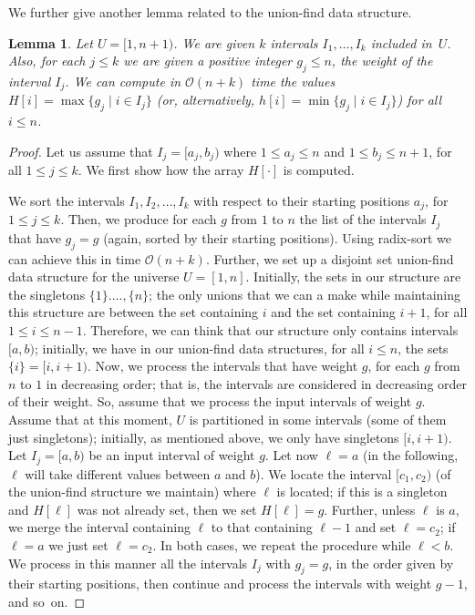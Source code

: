 \documentclass[final]{dmtcs-episciences}
\newcommand{\bigo}{{\mathcal O}}
\newtheorem{lemma}{Lemma}
\begin{document}
We further give another lemma related to the union-find data structure.
\begin{lemma}\label{stabbing}
Let $U=[1,n+1)$. We are given $k$ intervals $I_1,\ldots, I_k$ included in~$U$. Also, for each $j\leq k$ we are given a positive integer $g_j\leq n$, the weight of the interval $I_j$. We can compute in $\bigo(n+k)$ time the values $H[i]=\max\{g_j\mid i\in I_j\}$ (or, alternatively, $h[i]=\min\{g_j\mid i\in I_j\}$) for all $i\leq n$.  
\end{lemma}
\begin{proof}
Let us assume that $I_j=[a_j,b_j)$ where $1\leq a_j\leq n$ and $1\leq b_j\leq n+1$, for all $1\leq j\leq k$. We first show how the array $H[\cdot]$ is computed.  

We sort the intervals $I_1, I_2,\ldots, I_k$ with respect to their starting positions $a_j$, for $1\leq j\leq k$. Then, we produce for each $g$ from $1$ to $n$ the list of the intervals $I_j$ that have $g_j=g$ (again, sorted by their starting positions). Using radix-sort we can achieve this in time $\bigo(n+k)$. Further, we set up a disjoint set union-find data structure for the universe $U=[1,n]$. Initially, the sets in our structure are the singletons $\{1\}.\ldots,\{n\}$; the only unions that we can a make while maintaining this structure are between the set containing $i$ and the set containing $i+1$, for all $1\leq i\leq n-1$. Therefore, we can think that our structure only contains intervals $[a,b)$; initially, we have in our union-find data structures, for all $i\leq n$, the sets $\{i\}=[i,i+1)$. Now, we process the intervals that have weight $g$, for each $g$ from $n$ to $1$ in decreasing order; that is, the intervals are considered in decreasing order of their weight. So, assume that we process the input intervals of weight $g$. Assume that at this moment, $U$ is partitioned in some intervals (some of them just singletons); initially, as mentioned above, we only have singletons $[i,i+1)$. Let $I_j=[a,b)$ be an input interval of weight $g$. Let now $\ell=a$ (in the following, $\ell$ will take different values between $a$ and $b$). We locate the interval $[c_1,c_2)$  (of the union-find structure we maintain) where $\ell $ is located; if this is a singleton and $H[\ell ]$ was not already set, then we set $H[\ell ]=g$. Further, unless $\ell $ is $a$, we merge the interval containing $\ell $ to that containing $\ell-1$ and set $\ell =c_2$; if $\ell =a$ we just set $\ell =c_2$.  In both cases, we repeat the procedure while $\ell <b$. We process in this manner all the intervals $I_j$ with $g_j=g$, in the order given by their starting positions, then continue and process the intervals with weight $g-1$, and so~on.


\end{proof}
\end{document}
